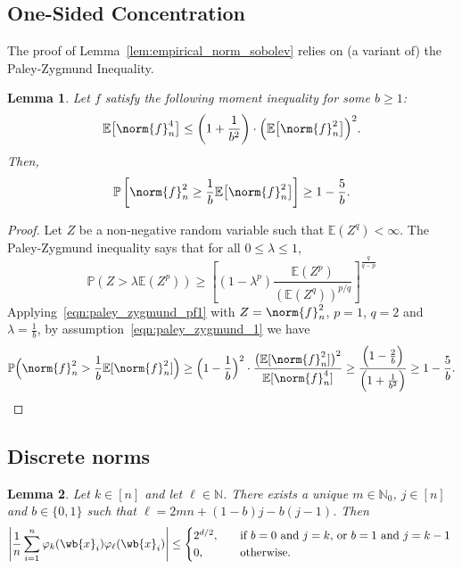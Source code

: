 \documentclass{article}
\newcommand{\abs}[1]{\left \lvert #1 \right \rvert}
\newcommand{\1}{\mathbf{1}}
\newcommand{\Nbb}{\mathbb{N}}
\newcommand{\Ebb}{\mathbb{E}}
\theoremstyle{alden}
\theoremstyle{aldenthm}
\newtheorem{lemma}{Lemma}
\theoremstyle{definition}
\theoremstyle{remark}
\begin{document}
\subsection{One-Sided Concentration}
	
The proof of Lemma~\ref{lem:empirical_norm_sobolev} relies on (a variant of) the Paley-Zygmund Inequality.
\begin{lemma}
	\label{lem:paley_zygmund}
	Let $f$ satisfy the following moment inequality for some $b \geq 1$:
	\begin{equation}
	\label{eqn:paley_zygmund_1}
	\Ebb\bigl[\norm{f}_n^4\bigr] \leq \left(1 + \frac{1}{b^2}\right)\cdot\Bigl(\Ebb\bigl[\norm{f}_n^2\bigr]\Bigr)^2.
	\end{equation}
	Then,
	\begin{equation}
	\label{eqn:paley_zygmund_2}
	\mathbb{P}\left[\norm{f}_n^2 \geq \frac{1}{b} \Ebb\bigl[\norm{f}_n^2\bigr]\right] \geq 1 - \frac{5}{b}.
	\end{equation}
\end{lemma}
\begin{proof}
	Let $Z$ be a non-negative random variable such that $\mathbb{E}(Z^q) < \infty$. The Paley-Zygmund inequality says that for all $0 \leq \lambda \leq 1$,
	\begin{equation}
	\label{eqn:paley_zygmund_pf1}
	\mathbb{P}(Z > \lambda \mathbb{E}(Z^p)) \geq \left[(1 - \lambda^p) \frac{\mathbb{E}(Z^p)}{(\mathbb{E}(Z^q))^{p/q}}\right]^{\frac{q}{q - p}}
	\end{equation}
	Applying~\eqref{eqn:paley_zygmund_pf1} with $Z = \norm{f}_n^2$, $p = 1$, $q = 2$ and $\lambda = \frac{1}{b}$, by assumption~\eqref{eqn:paley_zygmund_1} we have
	\begin{equation*}
	\mathbb{P}\Bigl(\norm{f}_n^2 > \frac{1}{b} \mathbb{E}[\norm{f}_n^2]\Bigr) \geq \Bigl(1 - \frac{1}{b}\Bigr)^2 \cdot  \frac{\bigl(\mathbb{E}[\norm{f}_n^2]\bigr)^2}{\mathbb{E}[\norm{f}_n^4]} \geq \frac{\Bigl(1 - \frac{2}{b}\Bigr)}{\Bigl(1 + \frac{1}{b^2}\Bigr)} \geq 1 - \frac{5}{b}.
	\end{equation*}
\end{proof}

\subsection{Discrete norms}
\begin{lemma}
	\label{lem:alias}
	Let $k \in [n]$ and let $\ell \in \Nbb$. There exists a unique $m \in \Nbb_{0}$, $j \in [n]$ and $b \in \{0,1\}$ such that $\ell = 2mn + (1 - b)j - b(j - 1)$. Then
	\begin{equation*}
	\abs{\frac{1}{n}\sum_{i = 1}^{n} \varphi_{k}(\wb{x}_i)\varphi_{\ell}(\wb{x}_i)} \leq  
	\begin{cases*}
	2^{d/2},& ~~ \textrm{if $b = 0$ and $j = k$, or $b = 1$ and $j = k - 1$} \\
	0,& ~~ \textrm{otherwise.}
	\end{cases*}
	\end{equation*}
\end{lemma}
\end{document}
